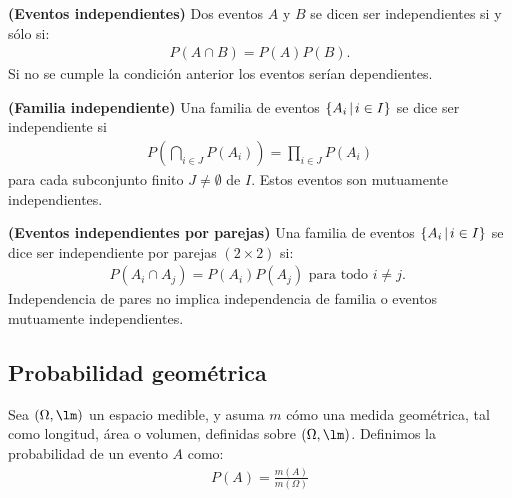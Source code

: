 \begin{definition}{\bf (Eventos independientes)}
    Dos eventos $A$ y $B$ se dicen ser independientes si y s\'olo si:
    \begin{align*}
        P(A\cap B) = P(A)P(B).
    \end{align*}
    Si no se cumple la condici\'on anterior los eventos ser\'ian dependientes. 
\end{definition}

\begin{definition}{\bf (Familia independiente)}
    Una familia de eventos $\{A_i \hspace{0.5mm}|\hspace{0.5mm} i\in I\}$ se dice ser independiente si 
    \begin{align*}
        P \left( \bigcap_{i\in J} P(A_i)\right) = \prod_{i\in J}P(A_i)
    \end{align*}
    para cada subconjunto finito $J\not=\emptyset$ de $I$. Estos eventos son mutuamente independientes.
\end{definition}

\begin{definition}{\bf (Eventos independientes por parejas)}
    \hspace{0.4mm}\newline
    Una familia de eventos $\{ A_i \hspace{0.5mm}|\hspace{0.5mm} i\in I\}$ se dice ser independiente por parejas $(2\times 2)$ si: 
    \begin{align*}
        P(A_i \cap A_j) = P(A_i)P(A_j) \text{ para todo $i\not= j$. }
    \end{align*}
    Independencia de pares no implica independencia de familia o eventos mutuamente independientes.
\end{definition}

\subsection{Probabilidad geom\'etrica}
Sea $(\Omega, \lm)$ un espacio medible, y asuma $m$ c\'omo una medida geom\'etrica, tal como longitud, \'area o volumen, definidas sobre $(\Omega, \lm)$. 
Definimos la probabilidad de un evento $A$ como: 
\begin{align}
    P(A) = \frac{m(A)}{m(\Omega)}
\end{align}



